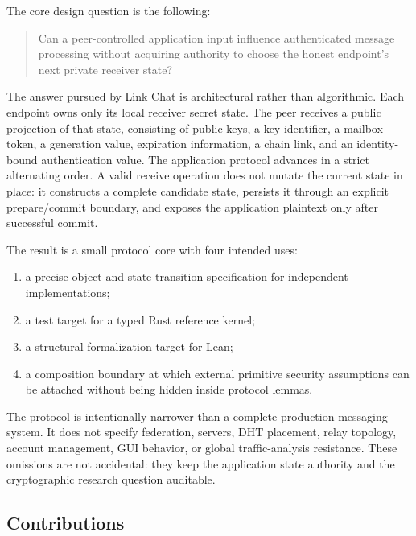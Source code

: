 \documentclass[11pt,letterpaper]{article}
\begin{document}
The core design question is the following:

\begin{quote}
Can a peer-controlled application input influence authenticated message processing without
acquiring authority to choose the honest endpoint's next private receiver state?
\end{quote}

The answer pursued by Link Chat is architectural rather than algorithmic. Each endpoint
owns only its local receiver secret state. The peer receives a public projection of that
state, consisting of public keys, a key identifier, a mailbox token, a generation value,
expiration information, a chain link, and an identity-bound authentication value. The
application protocol advances in a strict alternating order. A valid receive operation
does not mutate the current state in place: it constructs a complete candidate state,
persists it through an explicit prepare/commit boundary, and exposes the application
plaintext only after successful commit.

The result is a small protocol core with four intended uses:
\begin{enumerate}[leftmargin=*]
  \item a precise object and state-transition specification for independent
        implementations;
  \item a test target for a typed Rust reference kernel;
  \item a structural formalization target for Lean;
  \item a composition boundary at which external primitive security assumptions can be
        attached without being hidden inside protocol lemmas.
\end{enumerate}

The protocol is intentionally narrower than a complete production messaging system. It
does not specify federation, servers, DHT placement, relay topology, account management,
GUI behavior, or global traffic-analysis resistance. These omissions are not accidental:
they keep the application state authority and the cryptographic research question
auditable.

\subsection{Contributions}
\end{document}
